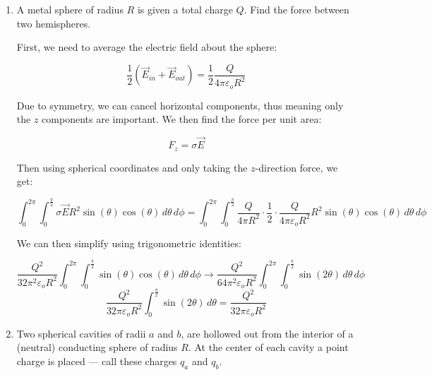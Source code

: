 \begin{enumerate}
\begin{enumerate}
        We can then take the gradient to find the electric field as:

        $$\vec{E}=Ae^{-\lambda r}\frac{\partial}{\partial r}\left( \frac{1}{r} \right)+\frac{A}{r}\frac{\partial}{\partial r}\left( e^{-\lambda r}\right)$$
        $$=-\frac{Ae^{-\lambda r}}{r^2} \right)+\frac{-\lambda Ae^{-\lambda r}}{r}$$

      \item Show that the charge density is given by $\rho(r)=\varepsilon_oA\left( 4\pi\delta^3(\vec{r})-\frac{\lambda^2e^{-\lambda r}}{r} \right)$

      \item Find the total integrated charge $Q$

    \end{enumerate}

  \item A metal sphere of radius $R$ is given a total charge $Q$. Find the force between two hemispheres.

    First, we need to average the electric field about the sphere:

    $$\frac{1}{2}\left( \vec{E}_{in}+\vec{E}_{out} \right)=\frac{1}{2}\frac{Q}{4\pi\varepsilon_oR^2}$$

    Due to symmetry, we can cancel horizontal components, thus meaning only the $z$ components are important. We then find the force per unit area:

    $$F_z=\sigma \vec{E}$$

    Then using spherical coordinates and only taking the $z$-direction force, we get:

    $$\int_0^{2\pi}\int_0^{\frac{\pi}{2}}\sigma \vec{E}R^2\sin(\theta)\cos(\theta)\,d\theta\,d\phi=\int_0^{2\pi}\int_0^{\frac{\pi}{2}}\frac{Q}{4\pi R^2}\cdot\frac{1}{2}\cdot\frac{Q}{4\pi\varepsilon_oR^2} R^2\sin(\theta)\cos(\theta)\,d\theta\,d\phi$$

    We can then simplify using trigonometric identities:

    $$\frac{Q^2}{32\pi^2 \varepsilon_oR^2}\int_0^{2\pi}\int_0^{\frac{\pi}{2}}\sin(\theta)\cos(\theta)\,d\theta\,d\phi\rightarrow\frac{Q^2}{64\pi^2 \varepsilon_oR^2}\int_0^{2\pi}\int_0^{\frac{\pi}{2}}\sin(2\theta)\,d\theta\,d\phi$$
    $$\boxed{\frac{Q^2}{32\pi \varepsilon_oR^2}\int_0^{\frac{\pi}{2}}\sin(2\theta)\,d\theta=\frac{Q^2}{32\pi \varepsilon_oR^2}}$$

  \item Two spherical cavities of radii $a$ and $b$, are hollowed out from the interior of a (neutral) conducting sphere of radius $R$.  At the center of each cavity a point charge is placed — call these charges $q_a$ and $q_b$.


\end{enumerate}
